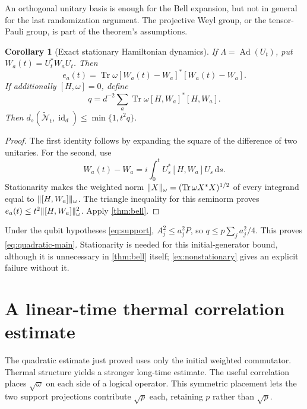 \documentclass[11pt,reqno]{amsart}
\numberwithin{equation}{section}
\newtheorem{corollary}[theorem]{Corollary}
\theoremstyle{definition}
\theoremstyle{remark}
\newcommand{\Tr}{\operatorname{Tr}}
\newcommand{\id}{\operatorname{id}}
\newcommand{\Ad}{\operatorname{Ad}}
\newcommand{\Ncal}{\mathcal N}
\newcommand{\dd}{\mathrm d}
\newcommand{\diam}{d_\diamond}
\DeclarePairedDelimiter{\norm}{\lVert}{\rVert}
\begin{document}
An orthogonal unitary basis is enough for the Bell expansion, but not in
general for the last randomization argument. The projective Weyl group,
or the tensor-Pauli group, is part of the theorem's assumptions.

\begin{corollary}[Exact stationary Hamiltonian dynamics]\label{cor:quadratic}
If \(\Lambda=\Ad(U_t)\), put \(W_a(t)=U_t^*W_aU_t\). Then
\[
 e_a(t)=\Tr\omega[W_a(t)-W_a]^*[W_a(t)-W_a].
\]
If additionally \([H,\omega]=0\), define
\[
 q=d^{-2}\sum_a\Tr\omega[H,W_a]^*[H,W_a].
\]
Then \(\diam(\widetilde{\Ncal}_t,\id_d)\le\min\{1,t^2q\}\).
\end{corollary}
\begin{proof}
The first identity follows by expanding the square of the difference of
two unitaries. For the second, use
\[
 W_a(t)-W_a=i\int_0^t U_s^*[H,W_a]U_s\,\dd s.
\]
Stationarity makes the weighted norm
\(\norm{X}_\omega=(\Tr\omega X^*X)^{1/2}\) of every integrand
equal to \(\norm{[H,W_a]}_\omega\). The triangle inequality for
this seminorm proves \(e_a(t)\le t^2\norm{[H,W_a]}_\omega^2\).
Apply \cref{thm:bell}.
\end{proof}

Under the qubit hypotheses \eqref{eq:support},
\(A_j^2\le a_j^2P\), so
\(q\le p\sum_ja_j^2/4\). This proves
\eqref{eq:quadratic-main}. Stationarity is needed for this
initial-generator bound, although it is unnecessary in \cref{thm:bell}
itself; \cref{ex:nonstationary} gives an explicit failure without it.

\section{A linear-time thermal correlation estimate}\label{sec:thermal}

The quadratic estimate just proved uses only the initial weighted
commutator. Thermal structure yields a stronger long-time estimate.
The useful correlation places \(\sqrt\omega\) on each side of a logical
operator. This symmetric placement lets the two support projections
contribute \(\sqrt p\) each, retaining \(p\) rather than \(\sqrt p\).
\end{document}
